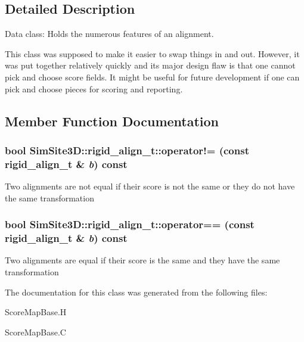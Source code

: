 \subsection{Detailed Description}
Data class: Holds the numerous features of an alignment. 

This class was supposed to make it easier to swap things in and out. However, it was put together relatively quickly and its major design flaw is that one cannot pick and choose score fields. It might be useful for future development if one can pick and choose pieces for scoring and reporting. 



\subsection{Member Function Documentation}
\subsubsection{\setlength{\rightskip}{0pt plus 5cm}bool SimSite3D::rigid\_\-align\_\-t::operator!= (const \bf{rigid\_\-align\_\-t} \& {\em b}) const\hspace{0.3cm}{\tt  [inline]}}\label{classSimSite3D_1_1rigid__align__t_dd0fdb2785fd9d00e710d9afd3253f4a}


Two alignments are not equal if their score is not the same or they do not have the same transformation 
\subsubsection{\setlength{\rightskip}{0pt plus 5cm}bool SimSite3D::rigid\_\-align\_\-t::operator== (const \bf{rigid\_\-align\_\-t} \& {\em b}) const\hspace{0.3cm}{\tt  [inline]}}\label{classSimSite3D_1_1rigid__align__t_3f01290c1017cdf9f9e1e6a3bf7af5ac}


Two alignments are equal if their score is the same and they have the same transformation 

The documentation for this class was generated from the following files:\begin{CompactItemize}
\item 
Score\-Map\-Base.H\item 
Score\-Map\-Base.C\end{CompactItemize}
